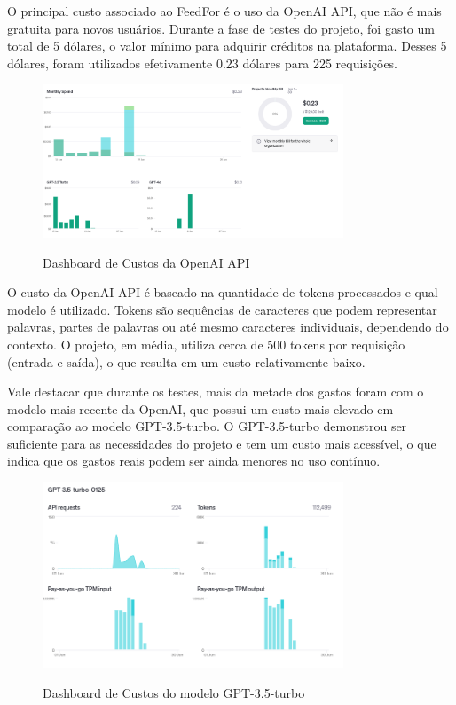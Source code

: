 O principal custo associado ao FeedFor é o uso da OpenAI API, que não é mais gratuita para novos usuários. Durante a fase de testes do projeto, foi gasto um total de 5 dólares, o valor mínimo para adquirir créditos na plataforma. Desses 5 dólares, foram utilizados efetivamente 0.23 dólares para 225 requisições.

\begin{figure}[H]
    \centering
    \caption{Dashboard de Custos da OpenAI API}
    \includegraphics[width=0.8\textwidth]{figuras/cost_openai.png}
    \label{fig:first_phase}
\end{figure}

O custo da OpenAI API é baseado na quantidade de tokens processados e qual modelo é utilizado. Tokens são sequências de caracteres que podem representar palavras, partes de palavras ou até mesmo caracteres individuais, dependendo do contexto. O projeto, em média, utiliza cerca de 500 tokens por requisição (entrada e saída), o que resulta em um custo relativamente baixo.

Vale destacar que durante os testes, mais da metade dos gastos foram com o modelo mais recente da OpenAI, que possui um custo mais elevado em comparação ao modelo GPT-3.5-turbo. O GPT-3.5-turbo demonstrou ser suficiente para as necessidades do projeto e tem um custo mais acessível, o que indica que os gastos reais podem ser ainda menores no uso contínuo.

\begin{figure}[H]
    \centering
    \caption{Dashboard de Custos do modelo GPT-3.5-turbo}
    \includegraphics[width=0.8\textwidth]{figuras/cost_gpt_35.png}
    \label{fig:first_phase}
\end{figure}

